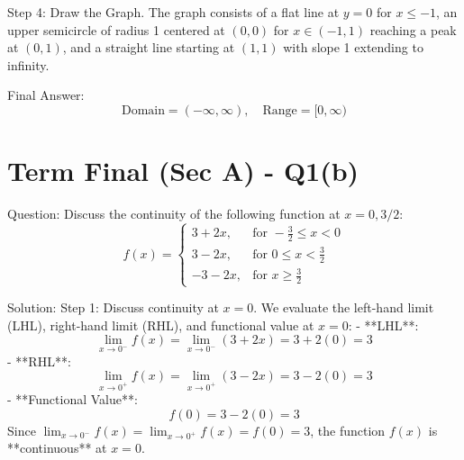 \documentclass{article}
\begin{document}
Step 4: Draw the Graph.
The graph consists of a flat line at $y = 0$ for $x \le -1$, an upper semicircle of radius 1 centered at $(0,0)$ for $x \in (-1, 1)$ reaching a peak at $(0,1)$, and a straight line starting at $(1,1)$ with slope 1 extending to infinity.

\begin{center}
\end{center}

Final Answer:
\[
\boxed{\text{Domain} = (-\infty, \infty), \quad \text{Range} = [0, \infty)}
\]

\section*{Term Final (Sec A) - Q1(b)}
Question:
Discuss the continuity of the following function at $x = 0, 3/2$:
\[
f(x) = \begin{cases}
3 + 2x, & \text{for } -\frac{3}{2} \le x < 0 \\
3 - 2x, & \text{for } 0 \le x < \frac{3}{2} \\
-3 - 2x, & \text{for } x \ge \frac{3}{2}
\end{cases}
\]

Solution:
Step 1: Discuss continuity at $x = 0$.
We evaluate the left-hand limit (LHL), right-hand limit (RHL), and functional value at $x = 0$:
- **LHL**:
  \[
  \lim_{x \to 0^-} f(x) = \lim_{x \to 0^-} (3 + 2x) = 3 + 2(0) = 3
  \]
- **RHL**:
  \[
  \lim_{x \to 0^+} f(x) = \lim_{x \to 0^+} (3 - 2x) = 3 - 2(0) = 3
  \]
- **Functional Value**:
  \[
  f(0) = 3 - 2(0) = 3
  \]
Since $\lim_{x \to 0^-} f(x) = \lim_{x \to 0^+} f(x) = f(0) = 3$, the function $f(x)$ is **continuous** at $x = 0$.
\end{document}
